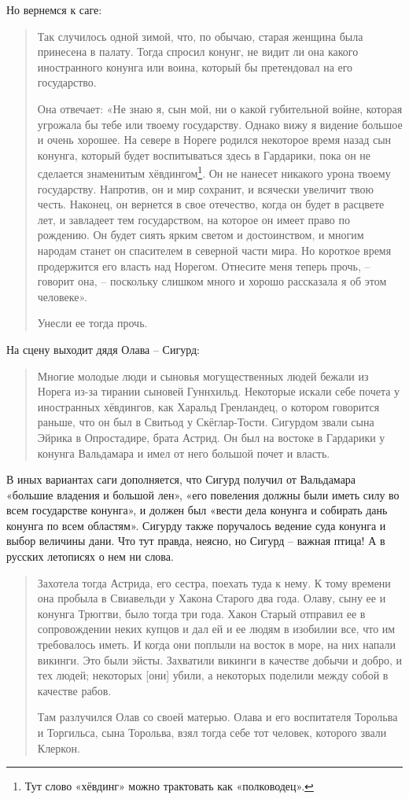Но вернемся к саге:

\begin{quotation}
Так случилось одной зимой, что, по обычаю, старая женщина была принесена в палату. Тогда спросил конунг, не видит ли она какого иностранного конунга или воина, который бы претендовал на его государство.

Она отвечает: «Не знаю я, сын мой, ни о какой губительной войне, которая угрожала бы тебе или твоему государству. Однако вижу я видение большое и очень хорошее. На севере в Нореге родился некоторое время назад сын конунга, который будет воспитываться здесь в Гардарики, пока он не сделается знаменитым хёвдингом\footnote{Тут слово «хёвдинг» можно трактовать как «полководец».}. Он не нанесет никакого урона твоему государству. Напротив, он и мир сохранит, и всячески увеличит твою честь. Наконец, он вернется в свое отечество, когда он будет в расцвете лет, и завладеет тем государством, на которое он имеет право по рождению. Он будет сиять ярким светом и достоинством, и многим народам станет он спасителем в северной части мира. Но короткое время продержится его власть над Норегом. Отнесите меня теперь прочь, – говорит она, – поскольку слишком много и хорошо рассказала я об этом человеке». 

Унесли ее тогда прочь.
\end{quotation}

На сцену выходит дядя Олава – Сигурд:

\begin{quotation}
Многие молодые люди и сыновья могущественных людей бежали из Норега из-за тирании сыновей Гуннхильд. Некоторые искали себе почета у иностранных хёвдингов, как Харальд Гренландец, о котором говорится раньше, что он был в Свитьод у Скёглар-Тости. Сигурдом звали сына Эйрика в Опростадире, брата Астрид. Он был на востоке в Гардарики у конунга Вальдамара и имел от него большой почет и власть. 
\end{quotation}

В иных вариантах саги дополняется, что Сигурд получил от Вальдамара «большие владения и большой лен», «его повеления должны были иметь силу во всем государстве конунга», и должен был «вести дела конунга и собирать дань конунга по всем областям». Сигурду также поручалось ведение суда конунга и выбор величины дани. Что тут правда, неясно, но Сигурд – важная птица! А в русских летописях о нем ни слова.

\begin{quotation}
Захотела тогда Астрида, его сестра, поехать туда к нему. К тому времени она пробыла в Свиавельди у Хакона Старого два года. Олаву, сыну ее и конунга Трюггви, было тогда три года. Хакон Старый отправил ее в сопровождении неких купцов и дал ей и ее людям в изобилии все, что им требовалось иметь. И когда они поплыли на восток в море, на них напали викинги. Это были эйсты. Захватили викинги в качестве добычи и добро, и тех людей; некоторых [они] убили, а некоторых поделили между собой в качестве рабов.

Там разлучился Олав со своей матерью. Олава и его воспитателя Торольва и Торгильса, сына Торольва, взял тогда себе тот человек, которого звали Клеркон.
\end{quotation}

